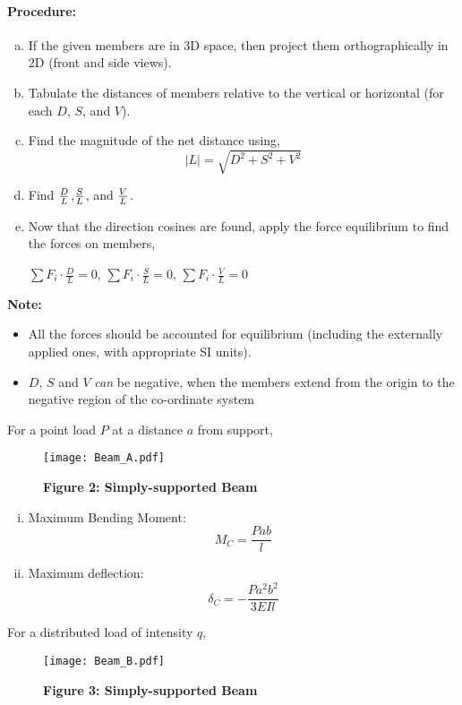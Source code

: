 \documentclass{article}
\begin{document}
{\paragraph{\Large Procedure:}
\begin{enumerate}[(a)]
\item If the given members are in 3D space, then project them orthographically in 2D (front and side views).
\item Tabulate the distances of members relative to the vertical or horizontal (for each $D$, $S$, and $V$).
\item Find the magnitude of the net distance using,
{\LARGE $$|L|=\sqrt{D^2+S^2+V^2}$$}
\item Find {\LARGE $D\over L$},{\LARGE $S\over L$}, and {\LARGE $V\over L$}.
\item Now that the direction cosines are found, apply the force equilibrium to find the forces on members,
\begin{center}
{\LARGE $\sum F_i\cdot \frac{D}L=0$}, {\LARGE $\sum F_i\cdot \frac{S}L=0$}, {\LARGE $\sum F_i\cdot \frac{V}L=0$}
\end{center}
\end{enumerate}
$\ $
\\
\textbf{\Large Note:} 
\begin{itemize}
\item All the forces should be accounted for equilibrium (including the externally applied ones, with appropriate SI units).
\item $D$, $S$ and $V$ \textit{can} be negative, when the members extend from the origin to the negative region of the co-ordinate system
\end{itemize}
\newpage
{\LARGE For a point load $P$ at a distance $a$ from support,}
\begin{figure}
\caption*{\Large \textbf{Figure 2: Simply-supported Beam}}
\hbox{\hspace{-2.2cm}\texttt{[image: Beam\_A.pdf]}}
\end{figure}
\begin{enumerate}[(i)]
\item Maximum Bending Moment: {\LARGE $$M_C=\frac{Pab}{l}$$}
\item Maximum deflection:
{\LARGE $$\delta_C=-\frac{Pa^2b^2}{3EIl}{}$$}
\end{enumerate}
\newpage
{\LARGE For a distributed load of intensity $q$,}
\begin{figure}
\caption*{\Large \textbf{Figure 3: Simply-supported Beam}}
\hbox{\hspace{-2.2cm}\texttt{[image: Beam\_B.pdf]}}

\end{figure}}
\end{document}
